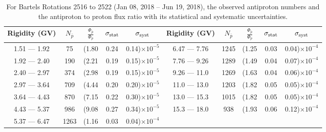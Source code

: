 \begin{table}[p] 
\renewcommand\baselinestretch{1.3}\selectfont
\setlength\tabcolsep{3pt}
\centering
\begin{tabular}{ccccc | ccccc}
\hline
\textbf{Rigidity}  (GV)  & $N_{\bar{p}}$ & $\frac{\Phi_{\bar{p}}}{\Phi_{p}}$ & $\sigma_{\rm{stat}}$ & $\sigma_{\rm{syst}}$ \hspace{1cm}   & \textbf{Rigidity}  (GV)  & $N_{\bar{p}}$ & $\frac{\Phi_{\bar{p}}}{\Phi_{p}}$ & $\sigma_{\rm{stat}}$ & $\sigma_{\rm{syst}}$ \hspace{1cm} \\ 
\hline
1.51 — 1.92   &  75                  &(1.80                          &  0.24              &      0.14)$\times 10^{-5}$  & 6.47 — 7.76                &  1245                    &(1.25                                &  0.03                   &      0.04)$\times 10^{-4}$\\
1.92 — 2.40   &  190                &(2.21                          &  0.19              &      0.15)$\times 10^{-5}$  & 7.76 — 9.26                &  1289                    &(1.49                                &  0.04                   &      0.07)$\times 10^{-4}$\\
2.40 — 2.97   &  374                &(2.98                          &  0.19              &      0.15)$\times 10^{-5}$  & 9.26 — 11.0                &  1269                    &(1.63                                &  0.04                   &      0.06)$\times 10^{-4}$\\    
2.97 — 3.64   &  709                &(4.44                          &  0.20              &      0.20)$\times 10^{-5}$  & 11.0 — 13.0                 &  1203                    &(1.82                                &  0.05                   &      0.05)$\times 10^{-4}$\\    
3.64 — 4.43   &  870                &(7.15                          &  0.22              &      0.30)$\times 10^{-5}$  & 13.0 — 15.3               &  1015                    &(1.82                                &  0.05                   &      0.05)$\times 10^{-4}$\\
4.43 — 5.37   &  986                &(9.08                          &  0.27              &      0.34)$\times 10^{-5}$  & 15.3 — 18.0               &  938                      &(1.93                                &  0.06                   &      0.12)$\times 10^{-4}$\\
5.37 — 6.47   &  1263              &(1.16                          &  0.03              &      0.04)$\times 10^{-4}$  & \\
\hline
\end{tabular}
\caption[Antiproton to proton flux ratio for Bartels Rotations 2516 to 2522]{For Bartels Rotations 2516 to 2522 (Jan 08, 2018 – Jun 19, 2018), the observed antiproton numbers and the antiproton to proton flux ratio with its statistical and systematic uncertainties.}
\label{TableOfDependent16}
\end{table}

